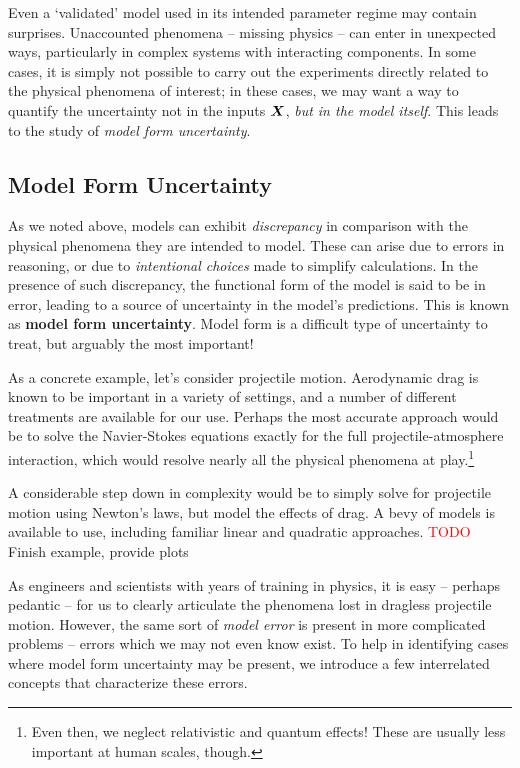 \documentclass[../primer.tex]{subfiles}
\begin{document}
Even a `validated' model used in its intended parameter regime may contain
surprises. Unaccounted phenomena -- missing physics -- can enter in unexpected
ways, particularly in complex systems with interacting components. In some
cases, it is simply not possible to carry out the experiments directly related
to the physical phenomena of interest; in these cases, we may want a way to
quantify the uncertainty not in the inputs $\boldsymbol{X}$, \emph{but in the model
  itself}. This leads to the study of \emph{model form uncertainty}.

\subsection{Model Form Uncertainty}
As we noted above, models can exhibit \emph{discrepancy} in comparison with the
physical phenomena they are intended to model. These can arise due to errors in
reasoning, or due to \emph{intentional choices} made to simplify calculations.
In the presence of such discrepancy, the functional form of the model is said to
be in error, leading to a source of uncertainty in the model's predictions. This
is known as \textbf{model form uncertainty}. Model form is a difficult type of
uncertainty to treat, but arguably the most important!

As a concrete example, let's consider projectile motion. Aerodynamic drag is
known to be important in a variety of settings, and a number of different
treatments are available for our use. Perhaps the most accurate approach would
be to solve the Navier-Stokes equations exactly for the full
projectile-atmosphere interaction, which would resolve nearly all the physical
phenomena at play.\footnote{Even then, we neglect relativistic and quantum
  effects! These are usually less important at human scales, though.}

A considerable step down in complexity would be to simply solve for projectile
motion using Newton's laws, but model the effects of drag. A bevy of models is
available to use, including familiar linear and quadratic approaches.
\textcolor{red}{TODO} Finish example, provide plots

As engineers and scientists with years of training in physics, it is easy --
perhaps pedantic -- for us to clearly articulate the phenomena lost in dragless
projectile motion. However, the same sort of \emph{model error} is present in
more complicated problems -- errors which we may not even know exist. To help in
identifying cases where model form uncertainty may be present, we introduce a
few interrelated concepts that characterize these errors.
\end{document}
